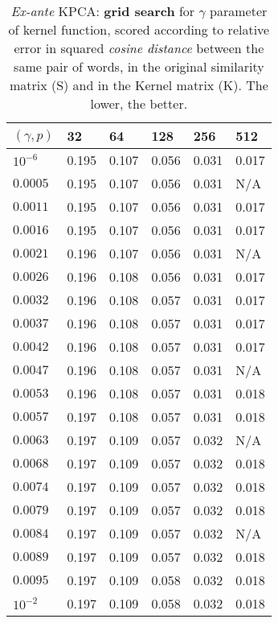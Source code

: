 \begin{table}[h!]

\centering

\begin{tabular}{|l|l|l|l|l|l|}
\hline
\rowcolor[HTML]{C0C0C0} 
$(\gamma, p)$ & 32 &  64 &  128 &  256 &  512 \\ \hline
\cellcolor[HTML]{C0C0C0}$10^{-6}$& 0.195 & 0.107 & 0.056 & 0.031 & 0.017 \\ \hline
\cellcolor[HTML]{C0C0C0}$0.0005$&0.195 & 0.107 & 0.056 & 0.031 & N/A\\ \hline
\cellcolor[HTML]{C0C0C0}$0.0011$&0.195 & 0.107 & 0.056 & 0.031 & 0.017 \\ \hline
\cellcolor[HTML]{C0C0C0}$0.0016$&0.195 & 0.107 & 0.056 & 0.031 & 0.017 \\ \hline
\cellcolor[HTML]{C0C0C0}$0.0021$&0.196 & 0.107 & 0.056 & 0.031 & N/A\\ \hline
\cellcolor[HTML]{C0C0C0}$0.0026$&0.196 & 0.108 & 0.056 & 0.031 & 0.017 \\ \hline
\cellcolor[HTML]{C0C0C0}$0.0032$&0.196 & 0.108 & 0.057 & 0.031 & 0.017 \\ \hline
\cellcolor[HTML]{C0C0C0}$0.0037$&0.196 & 0.108 & 0.057 & 0.031 & 0.017 \\ \hline
\cellcolor[HTML]{C0C0C0}$0.0042$&0.196 & 0.108 & 0.057 & 0.031 & 0.017 \\ \hline
\cellcolor[HTML]{C0C0C0}$0.0047$&0.196 & 0.108 & 0.057 & 0.031 & N/A\\ \hline
\cellcolor[HTML]{C0C0C0}$0.0053$&0.196 & 0.108 & 0.057 & 0.031 & 0.018 \\ \hline
\cellcolor[HTML]{C0C0C0}$0.0057$&0.197 & 0.108 & 0.057 & 0.031 & 0.018 \\ \hline
\cellcolor[HTML]{C0C0C0}$0.0063$&0.197 & 0.109 & 0.057 & 0.032 & N/A\\ \hline
\cellcolor[HTML]{C0C0C0}$0.0068$&0.197 & 0.109 & 0.057 & 0.032 & 0.018 \\ \hline
\cellcolor[HTML]{C0C0C0}$0.0074$&0.197 & 0.109 & 0.057 & 0.032 & 0.018 \\ \hline
\cellcolor[HTML]{C0C0C0}$0.0079$&0.197 & 0.109 & 0.057 & 0.032 & 0.018 \\ \hline
\cellcolor[HTML]{C0C0C0}$0.0084$&0.197 & 0.109 & 0.057 & 0.032 & N/A\\ \hline
\cellcolor[HTML]{C0C0C0}$0.0089$&0.197 & 0.109 & 0.057 & 0.032 & 0.018 \\ \hline
\cellcolor[HTML]{C0C0C0}$0.0095$&0.197 & 0.109 & 0.058 & 0.032 & 0.018 \\ \hline
\cellcolor[HTML]{C0C0C0}$10^{-2}$&0.197 & 0.109 & 0.058 & 0.032 & 0.018 \\ \hline
\end{tabular}

\caption{\textit{Ex-ante} KPCA: \textbf{grid search} for $\gamma$ parameter of kernel function, scored according to relative error in squared \textit{cosine distance} between the same pair of words, in the original similarity matrix (S) and in the Kernel matrix (K). The lower, the better.}
\label{table:cos-err-kpre}
\end{table}

